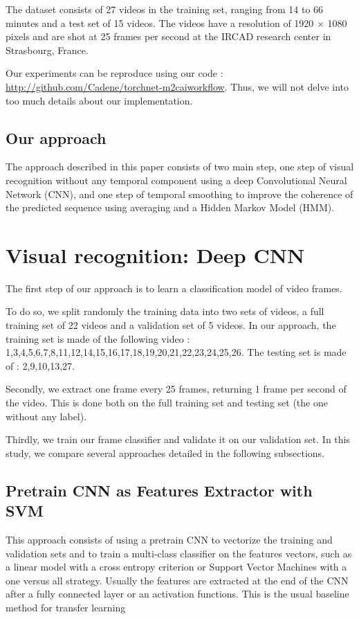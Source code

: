 \documentclass[10pt,twocolumn,letterpaper]{article}
\begin{document}
The dataset consists of 27 videos in the training set, ranging from 14 to 66
minutes and a test set of 15 videos. The videos have a resolution of 1920 $\times$
1080 pixels and are shot at 25 frames per second at the IRCAD research center in
Strasbourg, France.

Our experiments can be reproduce using our code : \url{http://github.com/Cadene/torchnet-m2caiworkflow}. Thus, we will not delve into too much details about our implementation.

\subsection{Our approach}

The approach described in this paper consists of two main step, one step of visual
recognition without any temporal component using a deep Convolutional Neural
Network (CNN), and one step of temporal smoothing to improve the coherence of the
predicted sequence using averaging and a Hidden Markov Model (HMM).

\section{Visual recognition: Deep CNN}

The first step of our approach is to learn a classification model of video frames.

To do so, we split randomly the training data into two sets of videos, a full training set of 22 videos and a validation
set of 5 videos. In our approach, the training set is made of the following video : 1,3,4,5,6,7,8,11,12,14,15,16,17,18,19,20,21,22,23,24,25,26. The testing set is made of : 2,9,10,13,27.

Secondly, we extract one frame every 25 frames, returning 1 frame per second
of the video. This is done both on the full training set and testing set (the one without any label).

Thirdly, we train our frame classifier and validate it on our validation set. In this study, we compare several approaches detailed in the following subsections.

\subsection{Pretrain CNN as Features Extractor with SVM}

This approach consists of using a pretrain CNN to vectorize the training and validation sets and to train a multi-class classifier on the features vectors, such as a linear model with a cross entropy criterion or Support Vector Machines with a one versus all strategy.
Usually the features are extracted at the end of the CNN after a fully connected layer or an activation functions. This is the usual baseline method for transfer learning %
\end{document}
